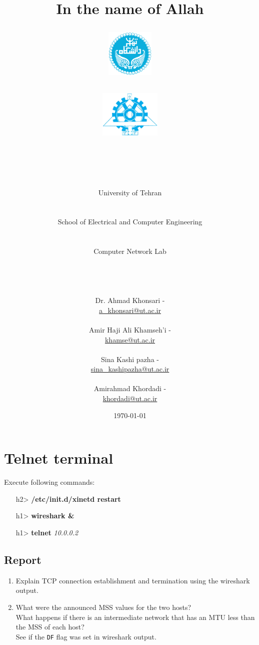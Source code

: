 \documentclass[10pt,a4paper]{article}
\title{
\normalsize In the name of Allah\\
\vspace{10pt}
\LARGE\FR{بسم \allah الرحمن الرحیم}
\vspace{10pt}
\begin{center}
	\begin{minipage}{0.48\textwidth} \begin{flushleft}
			\includegraphics[height=64pt,width=64pt]{img/logo.png}
	\end{flushleft}\end{minipage}
	\begin{minipage}{0.48\textwidth} \begin{flushright}
			\includegraphics[height=64pt]{img/eng-logo.png}
	\end{flushright}\end{minipage}
\end{center}
\vspace*{-64pt}
	\huge \titleText\\
\vspace{40pt}
}
\author{
	\huge University of Tehran\\
	\LARGE \FR{دانشگاه تهران}\\
	\\
	\LARGE School of Electrical and Computer Engineering\\
	\FR{دانشکده مهندسی برق و کامپیوتر}\\
	\\
	\Large Computer Network Lab\\
	\FR{آزمایشگاه شبکه‌های کامپیوتری}\\
	\\
	\\
	\\
	\normalfont
	Dr. Ahmad Khonsari - \FR{احمد خونساری}\\
	\href{mailto:a_khonsari@ut.ac.ir}{a\_khonsari@ut.ac.ir}\\
	\\
	\normalsize
	Amir Haji Ali Khamseh'i - \FR{امیر حاجی علی خمسه‌ء}\\
	\href{mailto:khamse@ut.ac.ir}{khamse@ut.ac.ir}\\
	\\
	\normalsize
	Sina Kashi pazha - \FR{سینا کاشی پزها}\\
	\href{mailto:sina\_kashipazha@ut.ac.ir}{sina\_kashipazha@ut.ac.ir}\\
	\\
	\normalsize
	Amirahmad Khordadi - \FR{امیر احمد خردادی}\\
	\href{mailto:khordadi@ut.ac.ir}{khordadi@ut.ac.ir}
}
\date{\vspace{30pt}\today\\\vspace{10pt}{\selectlanguage{farsi}\today}}
\numberwithin{equation}{section}
\numberwithin{figure}{section}
\numberwithin{table}{section}
\begin{document}

\maketitle


\pagebreak




\section*{Telnet terminal}
	Execute following commands: \\
	\begin{itemize}
		\item [h2>] \textbf{/etc/init.d/xinetd restart}
		\item [h1>] \textbf{wireshark \&}
		\item [h1>] \textbf{telnet} \textit{10.0.0.2}
	\end{itemize}
	\subsection*{Report}
	\begin{enumerate}
		\item Explain TCP connection establishment and termination using the wireshark output.
		\item What were the announced MSS values for the two hosts? \\
		What happens if there is an intermediate network that has an MTU less than the MSS of each host? \\
		See if the \texttt{DF} flag was set in wireshark output.
	\end{enumerate}
    
\end{document}
